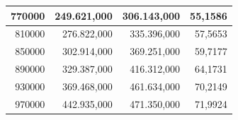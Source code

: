 \documentclass[a4paper, 12pt]{article}
\begin{document}
\begin{longtable}[c]{@{}rrrr@{}}
		\multicolumn{1}{|r|}{770000}                  & \multicolumn{1}{r|}{249.621,000}            & \multicolumn{1}{r|}{306.143,000}            & \multicolumn{1}{r|}{55,1586}                \\* \midrule
		\multicolumn{1}{|r|}{810000}                  & \multicolumn{1}{r|}{276.822,000}            & \multicolumn{1}{r|}{335.396,000}            & \multicolumn{1}{r|}{57,5653}                \\* \midrule
		\multicolumn{1}{|r|}{850000}                  & \multicolumn{1}{r|}{302.914,000}            & \multicolumn{1}{r|}{369.251,000}            & \multicolumn{1}{r|}{59,7177}                \\* \midrule
		\multicolumn{1}{|r|}{890000}                  & \multicolumn{1}{r|}{329.387,000}            & \multicolumn{1}{r|}{416.312,000}            & \multicolumn{1}{r|}{64,1731}                \\* \midrule
		\multicolumn{1}{|r|}{930000}                  & \multicolumn{1}{r|}{369.468,000}            & \multicolumn{1}{r|}{461.634,000}            & \multicolumn{1}{r|}{70,2149}                \\* \midrule
		\multicolumn{1}{|r|}{970000}                  & \multicolumn{1}{r|}{442.935,000}            & \multicolumn{1}{r|}{471.350,000}            & \multicolumn{1}{r|}{71,9924}                \\* \bottomrule
	\end{longtable}
\end{document}
